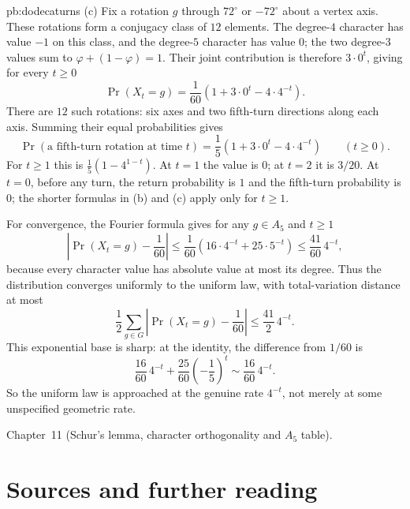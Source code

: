 \begin{solution}{pb:dodecaturns}
(c) Fix a rotation $g$ through $72^\circ$ or $-72^\circ$ about a vertex axis. These rotations form a conjugacy class of $12$ elements. The degree-$4$ character has value $-1$ on this class, and the degree-$5$ character has value $0$; the two degree-$3$ values sum to $\varphi+(1-\varphi)=1$. Their joint contribution is therefore $3\cdot0^t$, giving for every $t\ge0$
\[
\Pr(X_t=g)=\frac1{60}\left(1+3\cdot0^t-4\cdot4^{-t}\right).
\]
There are $12$ such rotations: six axes and two fifth-turn directions along each axis. Summing their equal probabilities gives
\[
\boxed{\Pr(\text{a fifth-turn rotation at time }t)
=\frac15\left(1+3\cdot0^t-4\cdot4^{-t}\right)}
\qquad(t\ge0).
\]
For $t\ge1$ this is $\frac15(1-4^{1-t})$.
At $t=1$ the value is $0$; at $t=2$ it is $3/20$. At $t=0$, before any turn, the return probability is $1$ and the fifth-turn probability is $0$; the shorter formulas in (b) and (c) apply only for $t\ge1$.

For convergence, the Fourier formula gives for any $g\in A_5$ and $t\ge1$
\[
\left|\Pr(X_t=g)-\frac1{60}\right|
\le\frac1{60}\left(16\cdot4^{-t}+25\cdot5^{-t}\right)
\le\frac{41}{60}\,4^{-t},
\]
because every character value has absolute value at most its degree. Thus the distribution converges uniformly to the uniform law, with total-variation distance at most
\[
\frac12\sum_{g\in G}\left|\Pr(X_t=g)-\frac1{60}\right|
\le\frac{41}{2}\,4^{-t}.
\]
This exponential base is sharp: at the identity, the difference from $1/60$ is
\[
\frac{16}{60}\,4^{-t}+\frac{25}{60}\left(-\frac15\right)^t
\sim\frac{16}{60}\,4^{-t}.
\]
So the uniform law is approached at the genuine rate $4^{-t}$, not merely at some unspecified geometric rate.

\tools Chapter~11 (Schur's lemma, character orthogonality and $A_5$ table).
\end{solution}

\section*{Sources and further reading}

